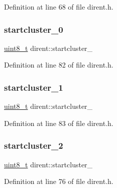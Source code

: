 Definition at line 68 of file dirent.\+h.

\mbox{\label{structdirent_a2123512eef0f2ede42d3c0b50a305c05}} 
\subsubsection{\texorpdfstring{startcluster\_0}{startcluster\_0}}
{\footnotesize\ttfamily \mbox{\hyperlink{stdint_8h_aba7bc1797add20fe3efdf37ced1182c5}{uint8\+\_\+t}} dirent\+::startcluster\+\_}



Definition at line 82 of file dirent.\+h.

\mbox{\label{structdirent_a8a2efd483ec6f7c2a28f5e91056ee335}} 
\subsubsection{\texorpdfstring{startcluster\_1}{startcluster\_1}}
{\footnotesize\ttfamily \mbox{\hyperlink{stdint_8h_aba7bc1797add20fe3efdf37ced1182c5}{uint8\+\_\+t}} dirent\+::startcluster\+\_}



Definition at line 83 of file dirent.\+h.

\mbox{\label{structdirent_a597c48e3f6846ed61c82c19b57fb7386}} 
\subsubsection{\texorpdfstring{startcluster\_2}{startcluster\_2}}
{\footnotesize\ttfamily \mbox{\hyperlink{stdint_8h_aba7bc1797add20fe3efdf37ced1182c5}{uint8\+\_\+t}} dirent\+::startcluster\+\_}



Definition at line 76 of file dirent.\+h.

\mbox{\label{structdirent_af33bcb58ec5f73d955d284b256ec6134}} 
